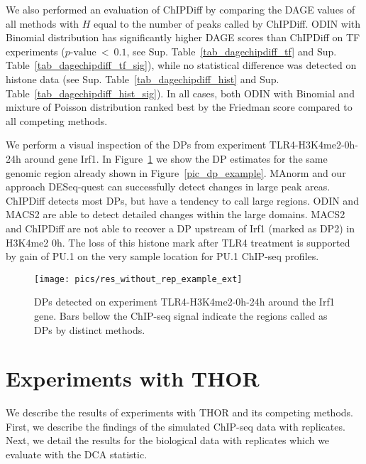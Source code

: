 We also performed an evaluation of ChIPDiff by comparing the DAGE values of all methods with $H$ equal to the number of peaks called by ChIPDiff. 
ODIN with Binomial distribution has significantly higher DAGE scores than ChIPDiff on TF experiments ($p\text{-value}~<~0.1$, see Sup. Table~\ref{tab_dagechipdiff_tf} and Sup. Table~\ref{tab_dagechipdiff_tf_sig}), while no statistical difference was detected on histone data (see Sup. Table~\ref{tab_dagechipdiff_hist} and Sup. Table~\ref{tab_dagechipdiff_hist_sig}). 
In all cases, both ODIN with Binomial and mixture of Poisson distribution ranked best by the Friedman score compared to all competing methods.

We perform a visual inspection of the DPs from experiment TLR4-H3K4me2-0h-24h around gene Irf1.
In Figure~\ref{fig_results_without_rep_example_ext} we show the DP estimates for the same genomic region already shown in Figure~\ref{pic_dp_example}. 
MAnorm and our approach DESeq-quest can successfully detect changes in large peak areas. 
ChIPDiff detects most DPs, but have a tendency to call large regions. 
ODIN and MACS2 are able to detect detailed changes within the large domains. 
MACS2 and ChIPDiff are not able to recover a DP upstream of Irf1 (marked as DP2) in H3K4me2 0h. 
The loss of this histone mark after TLR4 treatment is supported by gain of PU.1 on the very sample location for PU.1 ChIP-seq profiles.

\begin{figure}[ht]
  \centering
   \texttt{[image: pics/res\_without\_rep\_example\_ext]}
\caption[Example of DPs in biological data without replicates]{DPs detected on experiment TLR4-H3K4me2-0h-24h around the Irf1 gene. Bars bellow the ChIP-seq signal indicate the regions called as DPs by distinct methods.}
\label{fig_results_without_rep_example_ext}
\end{figure}

\clearpage


\section{Experiments with THOR}
We describe the results of experiments with THOR and its competing methods. 
First, we describe the findings of the simulated ChIP-seq data with replicates. 
Next, we detail the results for the biological data with replicates which we evaluate with the DCA statistic.

